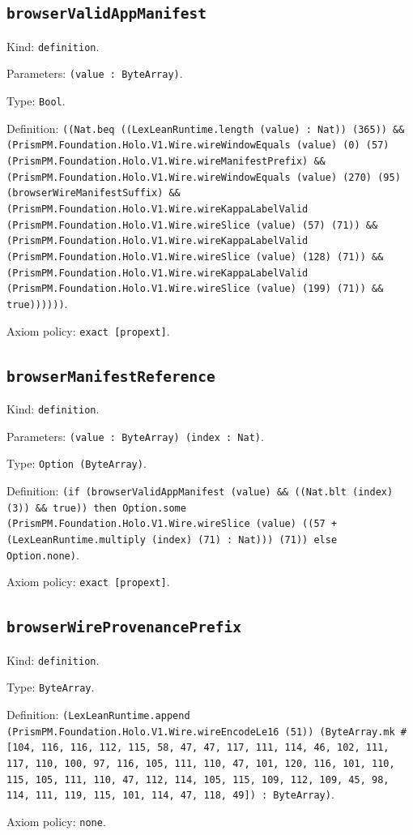 \documentclass[11pt]{article}
\begin{document}
\subsection*{\texttt{browserValidAppManifest}}
\noindent Kind: \texttt{definition}.\par
\noindent Parameters: \texttt{(value : ByteArray)}.\par
\noindent Type: \texttt{Bool}.\par
\noindent Definition: \texttt{((Nat.beq ((LexLeanRuntime.length (value) : Nat)) (365)) \&\& (PrismPM.Foundation.Holo.V1.Wire.wireWindowEquals (value) (0) (57) (PrismPM.Foundation.Holo.V1.Wire.wireManifestPrefix) \&\& (PrismPM.Foundation.Holo.V1.Wire.wireWindowEquals (value) (270) (95) (browserWireManifestSuffix) \&\& (PrismPM.Foundation.Holo.V1.Wire.wireKappaLabelValid (PrismPM.Foundation.Holo.V1.Wire.wireSlice (value) (57) (71)) \&\& (PrismPM.Foundation.Holo.V1.Wire.wireKappaLabelValid (PrismPM.Foundation.Holo.V1.Wire.wireSlice (value) (128) (71)) \&\& (PrismPM.Foundation.Holo.V1.Wire.wireKappaLabelValid (PrismPM.Foundation.Holo.V1.Wire.wireSlice (value) (199) (71)) \&\& true))))))}.\par
\noindent Axiom policy: \texttt{exact [propext]}.\par
\subsection*{\texttt{browserManifestReference}}
\noindent Kind: \texttt{definition}.\par
\noindent Parameters: \texttt{(value : ByteArray) (index : Nat)}.\par
\noindent Type: \texttt{Option (ByteArray)}.\par
\noindent Definition: \texttt{(if (browserValidAppManifest (value) \&\& ((Nat.blt (index) (3)) \&\& true)) then Option.some (PrismPM.Foundation.Holo.V1.Wire.wireSlice (value) ((57 + (LexLeanRuntime.multiply (index) (71) : Nat))) (71)) else Option.none)}.\par
\noindent Axiom policy: \texttt{exact [propext]}.\par
\subsection*{\texttt{browserWireProvenancePrefix}}
\noindent Kind: \texttt{definition}.\par
\noindent Type: \texttt{ByteArray}.\par
\noindent Definition: \texttt{(LexLeanRuntime.append (PrismPM.Foundation.Holo.V1.Wire.wireEncodeLe16 (51)) (ByteArray.mk \#[104, 116, 116, 112, 115, 58, 47, 47, 117, 111, 114, 46, 102, 111, 117, 110, 100, 97, 116, 105, 111, 110, 47, 101, 120, 116, 101, 110, 115, 105, 111, 110, 47, 112, 114, 105, 115, 109, 112, 109, 45, 98, 114, 111, 119, 115, 101, 114, 47, 118, 49]) : ByteArray)}.\par
\noindent Axiom policy: \texttt{none}.\par
\end{document}
